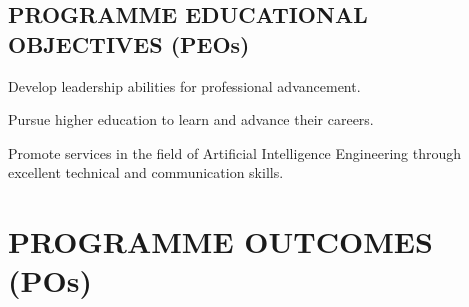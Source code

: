 \documentclass[12pt,a4paper]{article}
\begin{document}
\subsection*{PROGRAMME EDUCATIONAL OBJECTIVES (PEOs)}
\begin{description}[leftmargin=1.1cm,style=nextline,itemsep=0.2em]
\item[PEO1] Develop leadership abilities for professional advancement.
\item[PEO2] Pursue higher education to learn and advance their careers.
\item[PEO3] Promote services in the field of Artificial Intelligence Engineering through excellent technical and communication skills.
\end{description}
\clearpage

\section*{PROGRAMME OUTCOMES (POs)}
\small
\end{document}
